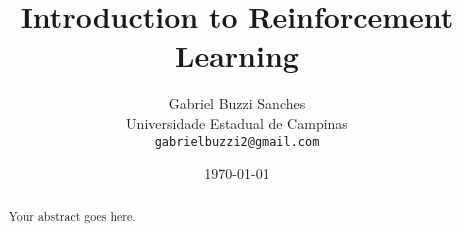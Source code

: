 \documentclass[11pt]{article}
\begin{document}

\title{Introduction to Reinforcement Learning}
\author{Gabriel Buzzi Sanches \\
\small Universidade Estadual de Campinas \\
\small \texttt{gabrielbuzzi2@gmail.com}}
\date{\today}

\maketitle

\begin{abstract}
    Your abstract goes here.
\end{abstract}







\end{document}
